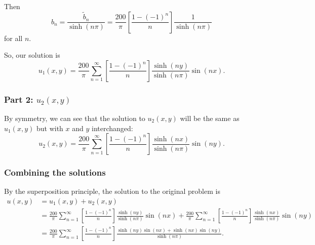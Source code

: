 \documentclass[plain]{pset}
\begin{document}
\begin{solution}
    Then
    \[b_n = \frac{\tilde{b}_n}{\sinh(n\pi)} = \frac{200}{\pi} \left[\frac{1 - (-1)^n}{n}\right]\frac{1}{\sinh(n\pi)}\]
    for all \(n\).

    So, our solution is
    \[u_1(x, y) = \frac{200}{\pi}\sum_{n=1}^\infty \left[\frac{1 - (-1)^n}{n}\right] \frac{\sinh(ny)}{\sinh(n\pi)}\sin(nx).\]

    \subsubsection*{Part 2: \(u_2(x, y)\)}
    By symmetry, we can see that the solution to \(u_2(x, y)\) will be the same as \(u_1(x, y)\) but with \(x\) and \(y\) interchanged:
    \[u_2(x, y) = \frac{200}{\pi}\sum_{n=1}^\infty \left[\frac{1 - (-1)^n}{n}\right] \frac{\sinh(nx)}{\sinh(n\pi)}\sin(ny).\]

    \subsubsection*{Combining the solutions}
    By the superposition principle, the solution to the original problem is
    \begin{align*}
        u(x, y) & = u_1(x, y) + u_2(x, y)                                                                                                       \\
                & = \frac{200}{\pi}\sum_{n=1}^\infty \left[\frac{1 - (-1)^n}{n}\right] \frac{\sinh(ny)}{\sinh(n\pi)}\sin(nx) + \frac{200}{\pi}\sum_{n=1}^\infty \left[\frac{1 - (-1)^n}{n}\right] \frac{\sinh(nx)}{\sinh(n\pi)}\sin(ny) \\
                & = \frac{200}{\pi}\sum_{n=1}^\infty \left[\frac{1 - (-1)^n}{n}\right] \frac{\sinh(ny)\sin(nx) + \sinh(nx)\sin(ny)}{\sinh(n\pi)}.
    \end{align*}
\end{solution}
\end{document}
